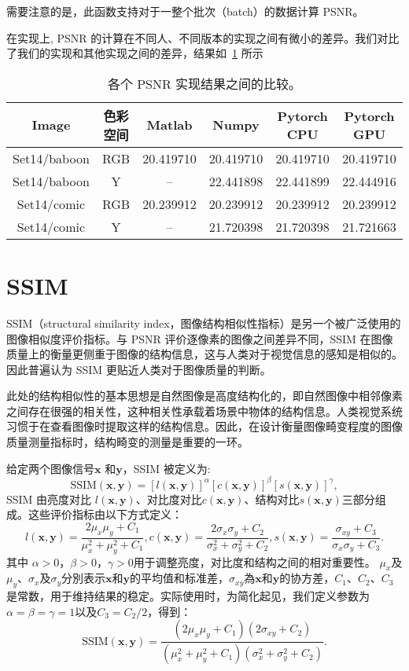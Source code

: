 \documentclass[../main.tex]{subfiles}
\begin{document}
需要注意的是，此函数支持对于一整个批次（batch）的数据计算 PSNR。

在实现上, PSNR 的计算在不同人、不同版本的实现之间有微小的差异。我们对比了我们的实现和其他实现之间的差异，结果如\tablename~\ref{tab:psnr} 所示

\begin{table}[]
    \centering
    \begin{tabular}{c|c|c|c|c|c} 
    \toprule
        Image & 色彩空间 & Matlab & Numpy & Pytorch CPU & Pytorch GPU \\
        \midrule
        Set14/baboon & RGB & 20.419710 & 20.419710 & 20.419710 & 20.419710 \\
        Set14/baboon & Y & -- & 22.441898 & 22.441899 & 22.444916\\
        Set14/comic & RGB & 20.239912& 20.239912&20.239912	&20.239912\\
Set14/comic&Y&--&21.720398&21.720398&21.721663\\
\bottomrule
    \end{tabular}
    \caption{各个 PSNR 实现结果之间的比较。}
    \label{tab:psnr}
\end{table}

\section{SSIM}
SSIM（structural similarity index，图像结构相似性指标）是另一个被广泛使用的图像相似度评价指标。与 PSNR 评价逐像素的图像之间差异不同，SSIM 在图像质量上的衡量更侧重于图像的结构信息，这与人类对于视觉信息的感知是相似的。因此普遍认为 SSIM 更贴近人类对于图像质量的判断。

此处的结构相似性的基本思想是自然图像是高度结构化的，即自然图像中相邻像素之间存在很强的相关性，这种相关性承载着场景中物体的结构信息。人类视觉系统习惯于在查看图像时提取这样的结构信息。因此，在设计衡量图像畸变程度的图像质量测量指标时，结构畸变的测量是重要的一环。

给定两个图像信号$\mathbf{x}$ 和$\mathbf{y} $，SSIM 被定义为:
$$\text{SSIM}(\mathbf {x} ,\mathbf {y} )=[l(\mathbf {x} ,\mathbf {y} )]^{\alpha }[c(\mathbf {x} ,\mathbf {y} )]^{\beta }[s(\mathbf {x} ,\mathbf {y} )]^{\gamma },$$
SSIM 由亮度对比 $l(\mathbf {x} ,\mathbf {y} )$、对比度对比$c(\mathbf {x} ,\mathbf {y} )$、结构对比$s(\mathbf {x} ,\mathbf {y} )$三部分组成。这些评价指标由以下方式定义：
$$
l(\mathbf {x} ,\mathbf {y} )={\frac {2\mu _{x}\mu _{y}+C_{1}}{\mu _{x}^{2}+\mu _{y}^{2}+C_{1}}},
c(\mathbf {x} ,\mathbf {y} )={\frac {2\sigma _{x}\sigma _{y}+C_{2}}{\sigma _{x}^{2}+\sigma _{y}^{2}+C_{2}}},
s(\mathbf {x} ,\mathbf {y} )={\frac {\sigma _{xy}+C_{3}}{\sigma _{x}\sigma _{y}+C_{3}}}.
$$
其中 $\alpha >0$，$\beta >0$，$\gamma >0$用于调整亮度，对比度和结构之间的相对重要性。
$\mu _{x}$及$\mu _{y}$、$\sigma _{x}$及$\sigma_{y}$分別表示$\mathbf{x}$和$\mathbf {y}$的平均值和标准差，$\sigma_{xy}$為$\mathbf{x}$和$\mathbf{y}$的协方差，$C_{1}$、$C_{2}$、$C_{3}$是常数，用于维持结果的稳定。实际使用时，为简化起见，我们定义参数为$\alpha =\beta =\gamma =1$以及$C_{3}=C_{2}/2$，得到：
$$
{\text{SSIM}}(\mathbf {x} ,\mathbf {y} )={\frac {(2\mu _{x}\mu _{y}+C_{1})(2\sigma _{xy}+C_{2})}{(\mu _{x}^{2}+\mu _{y}^{2}+C_{1})(\sigma _{x}^{2}+\sigma _{y}^{2}+C_{2})}}.
$$
\end{document}
